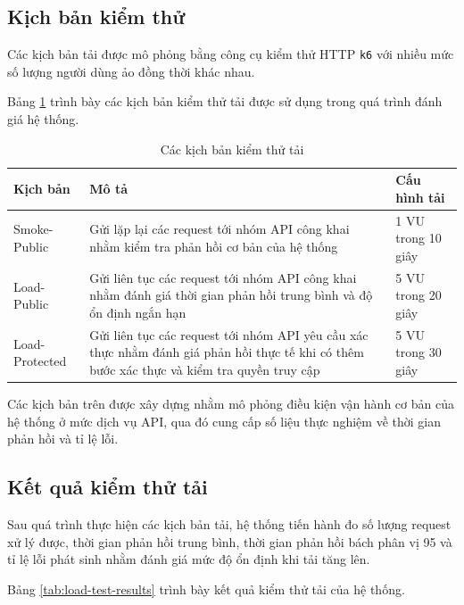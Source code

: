 \subsection{Kịch bản kiểm thử}

Các kịch bản tải được mô phỏng bằng công cụ kiểm thử HTTP \texttt{k6} với nhiều mức số lượng người dùng ảo đồng thời khác nhau.

Bảng \ref{tab:load-test-scenarios} trình bày các kịch bản kiểm thử tải được sử dụng trong quá trình đánh giá hệ thống.

\begin{table}[H]
\centering
\caption{Các kịch bản kiểm thử tải}
\label{tab:load-test-scenarios}
\small
\begin{tabular}{|p{2cm}|p{5.5cm}|p{4cm}|}
\hline
\textbf{Kịch bản} & \textbf{Mô tả} & \textbf{Cấu hình tải} \\ \hline

Smoke-Public & Gửi lặp lại các request tới nhóm API công khai nhằm kiểm tra phản hồi cơ bản của hệ thống & 1 VU trong 10 giây \\ \hline

Load-Public & Gửi liên tục các request tới nhóm API công khai nhằm đánh giá thời gian phản hồi trung bình và độ ổn định ngắn hạn & 5 VU trong 20 giây \\ \hline

Load-Protected & Gửi liên tục các request tới nhóm API yêu cầu xác thực nhằm đánh giá phản hồi thực tế khi có thêm bước xác thực và kiểm tra quyền truy cập & 5 VU trong 30 giây \\ \hline

\end{tabular}
\end{table}

Các kịch bản trên được xây dựng nhằm mô phỏng điều kiện vận hành cơ bản của hệ thống ở mức dịch vụ API, qua đó cung cấp số liệu thực nghiệm về thời gian phản hồi và tỉ lệ lỗi.

\subsection{Kết quả kiểm thử tải}

Sau quá trình thực hiện các kịch bản tải, hệ thống tiến hành đo số lượng request xử lý được, thời gian phản hồi trung bình, thời gian phản hồi bách phân vị 95 và tỉ lệ lỗi phát sinh nhằm đánh giá mức độ ổn định khi tải tăng lên.

Bảng \ref{tab:load-test-results} trình bày kết quả kiểm thử tải của hệ thống.

